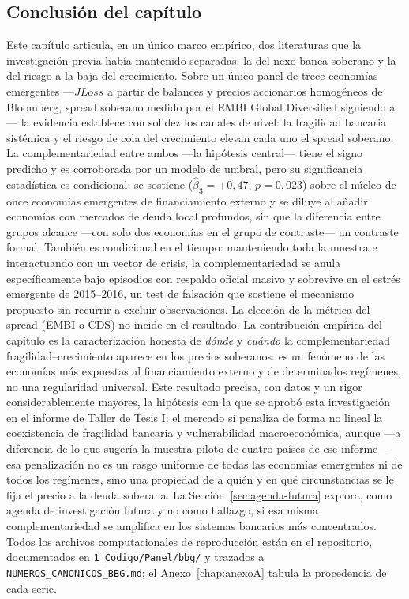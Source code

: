 \subsection{Conclusión del capítulo}

Este capítulo articula, en un único marco empírico, dos literaturas que la investigación previa había mantenido separadas: la del nexo banca-soberano y la del riesgo a la baja del crecimiento. Sobre un único panel de trece economías emergentes —$JLoss$ a partir de balances y precios accionarios homogéneos de Bloomberg, spread soberano medido por el EMBI Global Diversified siguiendo a \citet{Chari2024b}— la evidencia establece con solidez los canales de nivel: la fragilidad bancaria sistémica y el riesgo de cola del crecimiento elevan cada uno el spread soberano. La complementariedad entre ambos —la hipótesis central— tiene el signo predicho y es corroborada por un modelo de umbral, pero su significancia estadística es condicional: se sostiene ($\hat\beta_3=+0{,}47$, $p=0{,}023$) sobre el núcleo de once economías emergentes de financiamiento externo y se diluye al añadir economías con mercados de deuda local profundos, sin que la diferencia entre grupos alcance —con solo dos economías en el grupo de contraste— un contraste formal. También es condicional en el tiempo: manteniendo toda la muestra e interactuando con un vector de crisis, la complementariedad se anula específicamente bajo episodios con respaldo oficial masivo y sobrevive en el estrés emergente de 2015--2016, un test de falsación que sostiene el mecanismo propuesto sin recurrir a excluir observaciones. La elección de la métrica del spread (EMBI o CDS) no incide en el resultado. La contribución empírica del capítulo es la caracterización honesta de \emph{dónde} y \emph{cuándo} la complementariedad fragilidad--crecimiento aparece en los precios soberanos: es un fenómeno de las economías más expuestas al financiamiento externo y de determinados regímenes, no una regularidad universal. Este resultado precisa, con datos y un rigor considerablemente mayores, la hipótesis con la que se aprobó esta investigación en el informe de Taller de Tesis I: el mercado sí penaliza de forma no lineal la coexistencia de fragilidad bancaria y vulnerabilidad macroeconómica, aunque —a diferencia de lo que sugería la muestra piloto de cuatro países de ese informe— esa penalización no es un rasgo uniforme de todas las economías emergentes ni de todos los regímenes, sino una propiedad de a quién y en qué circunstancias se le fija el precio a la deuda soberana. La Sección~\ref{sec:agenda-futura} explora, como agenda de investigación futura y no como hallazgo, si esa misma complementariedad se amplifica en los sistemas bancarios más concentrados. Todos los archivos computacionales de reproducción están en el repositorio, documentados en \texttt{1\_Codigo/Panel/bbg/} y trazados a \texttt{NUMEROS\_CANONICOS\_BBG.md}; el Anexo~\ref{chap:anexoA} tabula la procedencia de cada serie.

